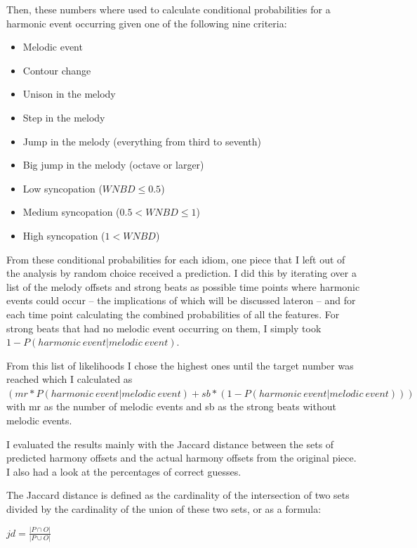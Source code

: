\documentclass[a4paper,12pt]{report}
\begin{document}
Then, these numbers where used to calculate conditional probabilities for a harmonic event occurring given one of the following nine criteria:
\vspace{1ex}
\begin{itemize}
	\item{Melodic event}
	\item{Contour change}
	\item{Unison in the melody}
	\item{Step in the melody}
	\item{Jump in the melody (everything from third to seventh)}
	\item{Big jump in the melody (octave or larger)}
	\item{Low syncopation ($WNBD \leq 0.5$)}
	\item{Medium syncopation ($0.5 < WNBD \leq 1$)}
	\item{High syncopation ($1 < WNBD$)}
\end{itemize}
\par
\vspace{2ex}
From these conditional probabilities for each idiom, one piece that I left out of the analysis by random choice received a prediction. I did this by iterating over a list of the melody offsets and strong beats as possible time points where harmonic events could occur -- the implications of which will be discussed lateron -- and for each time point calculating the combined probabilities of all the features. For strong beats that had no melodic event occurring on them, I simply took $1 - P(harmonic~event | melodic~event)$.

From this list of likelihoods I chose the highest ones until the target number was reached which I calculated as $(mr * P(harmonic~event|melodic~event) + sb * (1 - P(harmonic~event|melodic~event)))$ with mr as the number of melodic events and sb as the strong beats without melodic events.

I evaluated the results mainly with the Jaccard distance between the sets of predicted harmony offsets and the actual harmony offsets from the original piece. I also had a look at the percentages of correct guesses.

The Jaccard distance is defined as the cardinality of the intersection of two sets divided by the cardinality of the union of these two sets, or as a formula:

{\centering
\Large
$jd = \frac{|P\cap O|}{|P\cup O|}$
\par}
\normalsize
\end{document}
